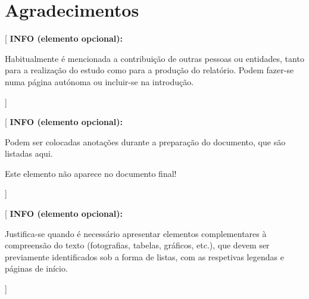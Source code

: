 \documentclass[11pt,a4paper]{report}
\newenvironment{infoopt}[1]{\vspace*{6mm}\color{blue}[ \textbf{INFO (elemento opcional):} \begin{em} #1}{\vspace*{3mm}\end{em} ]}
\begin{document}


\acresetall %


\chapter*{Agradecimentos}

\begin{infoopt}
Habitualmente é mencionada a contribuição de outras pessoas ou
entidades, tanto para a realização do estudo como para a produção do
relatório. 
Podem fazer-se numa página autónoma ou incluir-se na introdução.
\end{infoopt}


\renewcommand{\contentsname}{Índice}

\tableofcontents


\listoftodos

\begin{infoopt}
Podem ser colocadas anotações durante a preparação do documento, que
são listadas aqui.

Este elemento não aparece no documento final!
\end{infoopt}


\listoffigures

\begin{infoopt}
Justifica-se quando é necessário apresentar elementos complementares à
compreensão do texto (fotografias, tabelas, gráficos, etc.), que devem
ser previamente identificados sob a forma de listas, com as respetivas
legendas e páginas de início. 
\end{infoopt}
\end{document}
